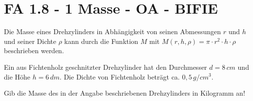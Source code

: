 \section{FA 1.8 - 1 Masse - OA - BIFIE}

\begin{beispiel}[FA 1.8]{1} %
Die Masse eines Drehzylinders in Abhängigkeit von seinen Abmessungen $r$ und $h$ und seiner Dichte $\rho$ kann durch die Funktion $M$ mit $M(r,h,\rho)=\pi \cdot r^2\cdot h\cdot \rho$ beschrieben werden.

Ein aus Fichtenholz geschnitzter Drehzylinder hat den Durchmesser $d=8\,cm$ und die Höhe $h=6\,dm$. Die Dichte von Fichtenholz beträgt ca. $0,5\,g/cm^3$.

Gib die Masse des in der Angabe beschriebenen Drehzylinders in Kilogramm an!
\leer

\end{beispiel}